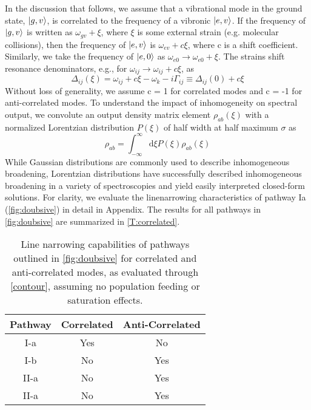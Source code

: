 \documentclass[aip, jcp, draft, onecolumn]{revtex4-2}
\begin{document}
In the discussion that follows, we assume that a vibrational mode in the ground state, $\ket{g,v}$, is correlated to the frequency of a vibronic $\ket{e,v}$.\cite{Carlson1990}
If the frequency of $\ket{g,v}$ is written as $\omega_{gv} + \xi$, where $\xi$ is some external strain (e.g. molecular collisions), then the frequency of $\ket{e,v}$ is $\omega_{ev} + c\xi$, where c is a shift coefficient.
Similarly, we take the frequency of $\ket{e,0}$ as $\omega_{e0} \rightarrow \omega_{e0} + \xi$.
The strains shift resonance denominators, e.g., for $\omega_{ij} \rightarrow \omega_{ij} + c\xi$, as
\begin{equation}
	\Delta_{ij}(\xi) = \omega_{ij} + c\xi -\omega_k - i\Gamma_{ij} \equiv \Delta_{ij}(0) + c\xi
\end{equation}
Without loss of generality, we assume c = 1 for correlated modes and c = -1 for anti-correlated modes.
To understand the impact of inhomogeneity on spectral output, we convolute an output density matrix element $\rho_{ab}(\xi)$ with a normalized Lorentzian distribution $P(\xi)$ of half width at half maximum $\sigma$ as
\begin{equation}\label{contour}
	\rho_{ab} = \int_{-\infty}^\infty \mathrm{d}\xi P(\xi) \rho_{ab}(\xi)
\end{equation} 
While Gaussian distributions are commonly used to describe inhomogeneous broadening,\cite{druet1979line, RN307, Ouellette1982} Lorentzian distributions have successfully described inhomogeneous broadening in a variety of spectroscopies and yield easily interpreted closed-form solutions. \cite{Penner1976, Desiderio1979, Dick83_1, Carlson1990line}
For clarity, we evaluate the linenarrowing characteristics of pathway Ia (\autoref{fig:doubsive}) in detail in Appendix.
The results for all pathways in \autoref{fig:doubsive} are summarized in \autoref{T:correlated}.

\begin{table}[!htbp]
	\caption{\label{T:correlated} Line narrowing capabilities of pathways outlined in \autoref{fig:doubsive} for correlated and anti-correlated modes, as evaluated through \autoref{contour}, assuming no population feeding or saturation effects.}
	\begin{ruledtabular}
		\begin{tabular}{ccc}
			Pathway & Correlated & Anti-Correlated\\
			\hline  
			I-a & Yes & No \\
			I-b & No & Yes\\
			II-a & No & Yes\\
			II-a & No & Yes\\
		\end{tabular}
	\end{ruledtabular}
\end{table}
\end{document}
